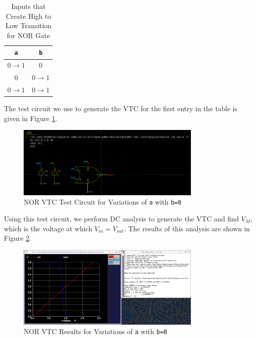 \documentclass{article}
\begin{document}
	\begin{table}[H]
	\begin{center}
	\caption{Inputs that Create High to Low Transition for NOR Gate}
	\label{table::nor_gate_high_to_low_transitions}
	\begin{tabular}{| c | c |}
		\hline
		\texttt{a} & \texttt{b} \\
		\hline	
		$0 \rightarrow 1$ & $0$\\
		\hline	
		$0$ & $0 \rightarrow 1$\\
		\hline	
		$0 \rightarrow 1$ & $0 \rightarrow 1$\\
		\hline
	\end{tabular}
	\end{center}
	\end{table}
	
	The test circuit we use to generate the VTC for the first entry in the table is given in Figure \ref{fig::nor_vtc_test_sweep_va}.
	
	\begin{figure}[H]
		\centerline{\includegraphics[width=0.8\textwidth]{nor_vtc_test_sweep_va.png}}
		\caption{NOR VTC Test Circuit for Variations of \texttt{a} with \texttt{b=0}}
		\label{fig::nor_vtc_test_sweep_va}
	\end{figure}	
	
	\noindent Using this test circuit, we perform DC analysis to generate the VTC and find $V_M$, which is the voltage at which $V_{in} = V_{out}$. The results of this analysis are shown in Figure \ref{fig::nor_vtc_sweep_va}.
	
	\begin{figure}[H]
		\centerline{\includegraphics[width=0.8\textwidth]{nor_vtc_sweep_va.png}}
		\caption{NOR VTC Results for Variations of \texttt{a} with \texttt{b=0}}
		\label{fig::nor_vtc_sweep_va}
	\end{figure}
	
\end{document}
